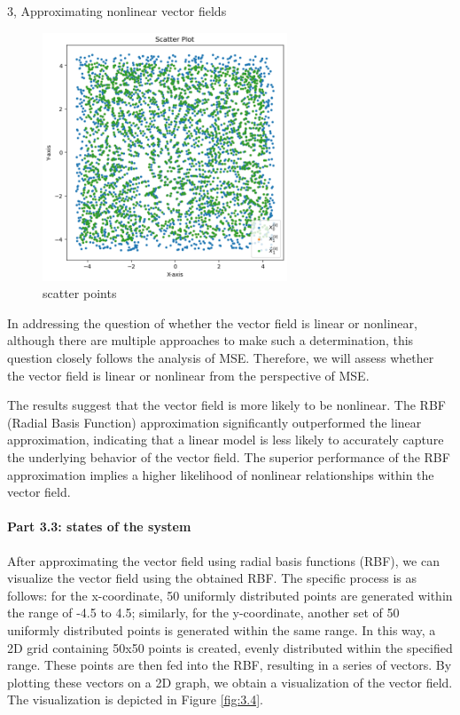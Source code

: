 \begin{task}{3, Approximating nonlinear vector fields}
\begin{figure}[H]
\centering
\includegraphics[width=0.65\textwidth]{images/nonlinear_vector_fields3.png}
\caption{scatter points}
\label{fig:3.3}
\end{figure}


In addressing the question of whether the vector field is linear or nonlinear, although there are multiple approaches to make such a determination, this question closely follows the analysis of MSE. Therefore, we will assess whether the vector field is linear or nonlinear from the perspective of MSE.

The results suggest that the vector field is more likely to be nonlinear. The RBF (Radial Basis Function) approximation significantly outperformed the linear approximation, indicating that a linear model is less likely to accurately capture the underlying behavior of the vector field. The superior performance of the RBF approximation implies a higher likelihood of nonlinear relationships within the vector field.

\paragraph{Part 3.3: states of the system}
After approximating the vector field using radial basis functions (RBF), we can visualize the vector field using the obtained RBF. The specific process is as follows: for the x-coordinate, 50 uniformly distributed points are generated within the range of -4.5 to 4.5; similarly, for the y-coordinate, another set of 50 uniformly distributed points is generated within the same range. In this way, a 2D grid containing 50x50 points is created, evenly distributed within the specified range. These points are then fed into the RBF, resulting in a series of vectors. By plotting these vectors on a 2D graph, we obtain a visualization of the vector field. The visualization is depicted in Figure \ref{fig:3.4}.


\end{task}
